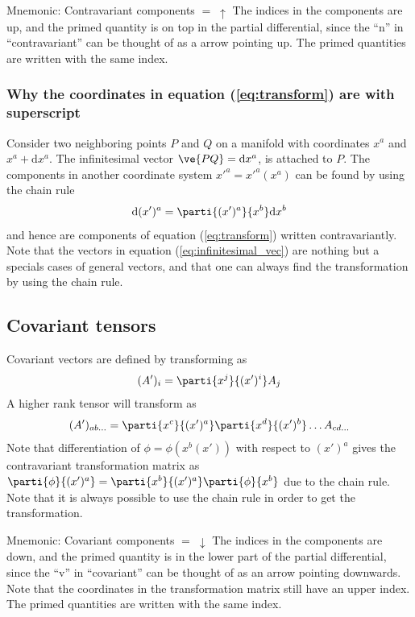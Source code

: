 \documentclass[a4paper, 12pt]{article}
\begin{document}
\vspace{0.5cm}
\begin{greenbox}{Mnemonic: Contravariant components $= \; \uparrow$}
 The indices in the components are up, and the primed quantity is on 
top in the partial differential, since the ``n'' in ``contravariant'' can be 
thought of as a arrow pointing up. The primed quantities are written with the 
same index.
\end{greenbox}
%
\subsubsection{Why the coordinates in equation (\ref{eq:transform}) are with 
superscript}
Consider two neighboring points $P$ and $Q$ on a manifold with coordinates 
$x^a$ and $x^a + \text{d}x^a$. The infinitesimal vector $\ve{PQ} = 
\text{d}x^a$, is attached to $P$. The components in another coordinate system 
$x'^a=x'^a(x^a)$ can be found by using the chain rule
%
\begin{align}
 \text{d}(x')^a = \parti{(x')^a}{x^b}\text{d}x^b \label{eq:infinitesimal_vec}
\end{align}
%
and hence are components of equation (\ref{eq:transform}) written 
contravariantly. Note that the vectors in equation (\ref{eq:infinitesimal_vec}) 
are nothing but a specials cases of general vectors, and that one can always 
find the transformation by using the chain rule.



\subsection{Covariant tensors}
Covariant vectors are defined by transforming as
%
\begin{align*}
 (A')_i = \parti{x^j}{(x')^i} A_j
\end{align*}
%
A higher rank tensor will transform as
%
\begin{align*}
 (A')_{ab\ldots} = \parti{x^{c}}{(x')^{a}}\parti{x^{d}}{(x')^{b}}\ldots 
A_{cd\ldots}
\end{align*}
%
Note that differentiation of $\phi=\phi(x^b(x'))$ with respect to $(x')^a$ 
gives the contravariant transformation matrix as 
$\parti{\phi}{(x')^a}=\parti{x^b}{(x')^a}\parti{\phi}{x^b}$ due to the chain 
rule. Note that it is always possible to use the chain rule in order to get 
the transformation\label{foot:phi}.

\vspace{0.5cm}
\begin{greenbox}{Mnemonic: Covariant components $= \; \downarrow$}
 The indices in the components are down, and the primed quantity is 
 in the lower part of the partial differential, since the ``v'' in 
 ``covariant'' can be thought of as an arrow pointing downwards. Note 
 that the coordinates in the transformation matrix still have an upper 
 index. The primed quantities are written with the same index.
\end{greenbox}
\end{document}
